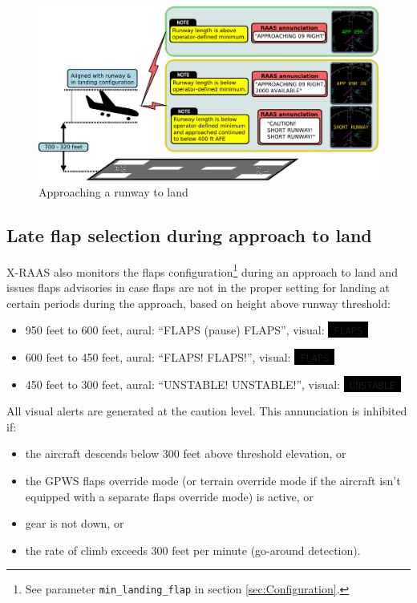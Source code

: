 \documentclass[a4paper,12pt]{article}
\newcommand{\visualadvisory}[3][b]{%
    \ifthenelse{\equal{#1}{b}}{\begin{center}}{}
    \noindent
    \colorbox{black}{\textcolor{#2visualadvisorycolor}{\large\texttt{~#3~}}}
    \ifthenelse{\equal{#1}{b}}{\end{center}}{}}
\newcommand{\confopt}[1]{\texttt{#1}}
\begin{document}
\begin{figure}[H]
\begin{center}
\includegraphics[width=\textwidth]{../src/apch_land.pdf}
\end{center}
\caption{Approaching a runway to land}
\end{figure}

\subsection{Late flap selection during approach to land}
\label{subsec:ApchFlapsMon}

X-RAAS also monitors the flaps configuration\footnote{See parameter
\confopt{min\_landing\_flap} in section \ref{sec:Configuration}.} during an
approach to land and issues flaps advisories in case flaps are not in the
proper setting for landing at certain periods during the approach, based
on height above runway threshold:

\begin{itemize}

\item 950 feet to 600 feet, aural: ``FLAPS (pause) FLAPS'',
visual:\visualadvisory[i]{nonroutine}{FLAPS}

\item 600 feet to 450 feet, aural: ``FLAPS! FLAPS!'',
visual:\visualadvisory[i]{nonroutine}{FLAPS}

\item 450 feet to 300 feet, aural: ``UNSTABLE! UNSTABLE!'',
visual:\visualadvisory[i]{nonroutine}{UNSTABLE}

\end{itemize}

\noindent All visual alerts are generated at the caution level. This
annunciation is inhibited if:

\begin{itemize}

\item the aircraft descends below 300 feet above threshold elevation, or

\item the GPWS flaps override mode (or terrain override mode if the
aircraft isn't equipped with a separate flaps override mode) is active,
or

\item gear is not down, or

\item the rate of climb exceeds 300 feet per minute (go-around
detection).

\end{itemize}
\end{document}
